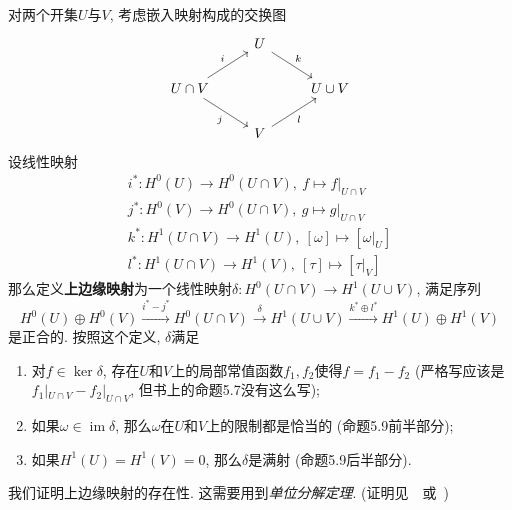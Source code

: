 \documentclass[11pt]{article}
\theoremstyle{definition}\newtheorem*{analyse}{分析}
\theoremstyle{remark}\newtheorem{rem*}{评注}
\DeclareMathOperator{\im}{im}
\begin{document}
对两个开集$U$与$V$, 考虑嵌入映射构成的交换图
\[\begin{tikzcd}
    & U \arrow[dr, "k"] & \\
    U\cap V \arrow[ur, "i"] \arrow[dr, "j"'] & & U\cup V\\
    & V \arrow[ur, "l"'] &
\end{tikzcd}\]
设线性映射
\begin{gather*}
    i^*:H^0(U)\to H^0(U\cap V),\ f\mapsto f|_{U\cap V}\\
    j^*:H^0(V)\to H^0(U\cap V),\ g\mapsto g|_{U\cap V}\\
    k^*:H^1(U\cap V)\to H^1(U),\ [\omega]\mapsto[\omega|_U]\\
    l^*:H^1(U\cap V)\to H^1(V),\ [\tau]\mapsto[\tau|_V]
\end{gather*}
那么定义\textbf{上边缘映射}为一个线性映射$\delta:H^0(U\cap V)\to H^1(U\cup V)$, 满足序列
\begin{equation}
    H^0(U)\oplus H^0(V)\xrightarrow{i^*-j^*}H^0(U\cap V)\xrightarrow{\delta}H^1(U\cup V)\xrightarrow{k^*\oplus l^*}H^1(U)\oplus H^1(V)
    \label{mayer-vietoris}
\end{equation}
是正合的.
按照这个定义, $\delta$满足
\begin{enumerate}
    \item 对$f\in\ker\delta$, 存在$U$和$V$上的局部常值函数$f_1,f_2$使得$f=f_1-f_2$ (严格写应该是$f_1|_{U\cap V}-f_2|_{U\cap V}$, 但书上的命题5.7没有这么写);
    \item 如果$\omega\in\im\delta$, 那么$\omega$在$U$和$V$上的限制都是恰当的 (命题5.9前半部分);
    \item 如果$H^1(U)=H^1(V)=0$, 那么$\delta$是满射 (命题5.9后半部分).
\end{enumerate}

我们证明上边缘映射的存在性.
这需要用到\textit{单位分解定理}.
(证明见~\cite[附录B2]{Fulton1995}~或~\cite[pp.\ 63--64]{Spivak1965})
\end{document}
